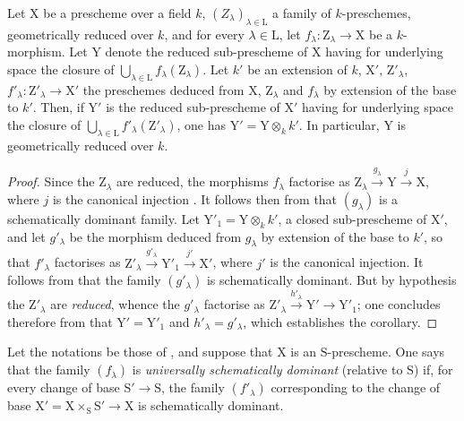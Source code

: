 \begin{corollary}[11.10.7]
\label{IV.11.10.7}
Let $\mathrm{X}$ be a prescheme over a field $k$, $(Z_\lambda)_{\lambda\in\mathrm{L}}$ a family of $k$-preschemes, geometrically reduced over $k$, and for every $\lambda\in\mathrm{L}$, let $f_\lambda:\mathrm{Z}_\lambda\to\mathrm{X}$ be a $k$-morphism.
Let $\mathrm{Y}$ denote the reduced sub-prescheme of $\mathrm{X}$ having for underlying space the closure of $\bigcup_{\lambda\in\mathrm{L}}f_\lambda(\mathrm{Z}_\lambda)$.
Let $k'$ be an extension of $k$, $\mathrm{X}'$, $\mathrm{Z}'_\lambda$, $f'_\lambda:\mathrm{Z}'_\lambda\to\mathrm{X}'$ the preschemes deduced from $\mathrm{X}$, $\mathrm{Z}_\lambda$ and $f_\lambda$ by extension of the base to $k'$.
Then, if $\mathrm{Y}'$ is the reduced sub-prescheme of $\mathrm{X}'$ having for underlying space the closure of $\bigcup_{\lambda\in\mathrm{L}}f'_\lambda(\mathrm{Z}'_\lambda)$, one has $\mathrm{Y}'=\mathrm{Y}\otimes_k k'$.
In particular, $\mathrm{Y}$ is geometrically reduced over $k$.
\end{corollary}

\begin{proof}
Since the $\mathrm{Z}_\lambda$ are reduced, the morphisms $f_\lambda$ factorise as $\mathrm{Z}_\lambda\xrightarrow{g_\lambda}\mathrm{Y}\xrightarrow{j}\mathrm{X}$, where $j$ is the canonical injection .
It follows then from  that $(g_\lambda)$ is a schematically dominant family.
Let $\mathrm{Y}'_1=\mathrm{Y}\otimes_k k'$, a closed sub-prescheme of $\mathrm{X}'$, and let $g'_\lambda$ be the morphism deduced from $g_\lambda$ by extension of the base to $k'$, so that $f'_\lambda$ factorises as $\mathrm{Z}'_\lambda\xrightarrow{g'_\lambda}\mathrm{Y}'_1\xrightarrow{j'}\mathrm{X}'$, where $j'$ is the canonical injection.
It follows from  that the family $(g'_\lambda)$ is schematically dominant.
But by hypothesis the $\mathrm{Z}'_\lambda$ are \emph{reduced}, whence  the $g'_\lambda$ factorise as $\mathrm{Z}'_\lambda\xrightarrow{h'_\lambda}\mathrm{Y}'\to\mathrm{Y}'_1$; one concludes therefore from  that $\mathrm{Y}'=\mathrm{Y}'_1$ and $h'_\lambda=g'_\lambda$, which establishes the corollary.
\end{proof}

\begin{definition}[11.10.8]
\label{IV.11.10.8}
Let the notations be those of , and suppose that $\mathrm{X}$ is an $\mathrm{S}$-prescheme.
One says that the family $(f_\lambda)$ is \emph{universally schematically dominant} (relative to $\mathrm{S}$) if, for every change of base $\mathrm{S}'\to\mathrm{S}$, the family $(f'_\lambda)$ corresponding to the change of base $\mathrm{X}'=\mathrm{X}\times_\mathrm{S}\mathrm{S}'\to\mathrm{X}$ is schematically dominant.
\end{definition}

